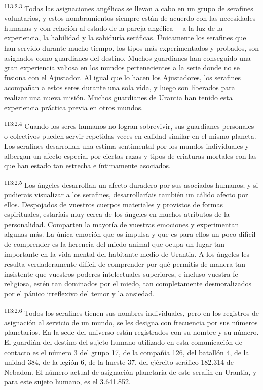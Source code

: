 \documentclass[twoside, 11pt]{book}
\begin{document}
\par
\textsuperscript{113:2.3} Todas las asignaciones angélicas se llevan a cabo en un grupo de serafines voluntarios, y estos nombramientos siempre están de acuerdo con las necesidades humanas y con relación al estado de la pareja angélica ---a la luz de la experiencia, la habilidad y la sabiduría seráficas. Únicamente los serafines que han servido durante mucho tiempo, los tipos más experimentados y probados, son asignados como guardianes del destino. Muchos guardianes han conseguido una gran experiencia valiosa en los mundos pertenecientes a la serie donde no se fusiona con el Ajustador. Al igual que lo hacen los Ajustadores, los serafines acompañan a estos seres durante una sola vida, y luego son liberados para realizar una nueva misión. Muchos guardianes de Urantia han tenido esta experiencia práctica previa en otros mundos.

\par
\textsuperscript{113:2.4} Cuando los seres humanos no logran sobrevivir, sus guardianes personales o colectivos pueden servir repetidas veces en calidad similar en el mismo planeta. Los serafines desarrollan una estima sentimental por los mundos individuales y albergan un afecto especial por ciertas razas y tipos de criaturas mortales con las que han estado tan estrecha e íntimamente asociados.

\par
\textsuperscript{113:2.5} Los ángeles desarrollan un afecto duradero por sus asociados humanos; y si pudierais visualizar a los serafines, desarrollaríais también un cálido afecto por ellos. Despojados de vuestros cuerpos materiales y provistos de formas espirituales, estaríais muy cerca de los ángeles en muchos atributos de la personalidad. Comparten la mayoría de vuestras emociones y experimentan algunas más. La única emoción que os impulsa y que es para ellos un poco difícil de comprender es la herencia del miedo animal que ocupa un lugar tan importante en la vida mental del habitante medio de Urantia. A los ángeles les resulta verdaderamente difícil de comprender por qué permitís de manera tan insistente que vuestros poderes intelectuales superiores, e incluso vuestra fe religiosa, estén tan dominados por el miedo, tan completamente desmoralizados por el pánico irreflexivo del temor y la ansiedad.

\par
\textsuperscript{113:2.6} Todos los serafines tienen sus nombres individuales, pero en los registros de asignación al servicio de un mundo, se les designa con frecuencia por sus números planetarios. En la sede del universo están registrados con su nombre y su número. El guardián del destino del sujeto humano utilizado en esta comunicación de contacto es el número 3 del grupo 17, de la compañía 126, del batallón 4, de la unidad 384, de la legión 6, de la hueste 37, del ejército seráfico 182.314 de Nebadon. El número actual de asignación planetaria de este serafín en Urantia, y para este sujeto humano, es el 3.641.852.
\end{document}
